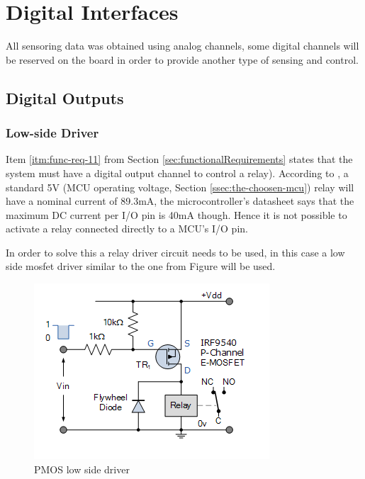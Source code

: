 \section{Digital Interfaces}\label{sec:digital-interfaces}

	All sensoring data was obtained using analog channels, some digital channels will be reserved on the board in order to provide another type of sensing and control.

	\subsection{Digital Outputs}\label{ssec:digital-outputs}

		\subsubsection{Low-side Driver}\label{sssec:digital-outputs-low-side-driver}

			Item \ref{itm:func-req-11} from Section \ref{sec:functionalRequirements} states that the system must have a digital output channel to control a relay). According to \cite{songle-relay-datasheet}, a standard 5V (MCU operating voltage, Section \ref{ssec:the-choosen-mcu}) relay will have a nominal current of 89.3mA, the microcontroller's datasheet \cite{atmega328p-datasheet} says that the maximum DC current per I/O pin is 40mA though. Hence it is not possible to activate a relay connected directly to a MCU's I/O pin.
			\par 
			In order to solve this a relay driver circuit needs to be used, in this case a low side mosfet driver similar to the one from Figure \cite{pmos-low-side-driver} will be used.

			\begin{figure}[htbp]
				\centering
				\includegraphics[scale=1]{figuras/fig-pmos-low-side-driver.png}
				\caption{PMOS low side driver \cite{pmos-low-side-driver}}
				\label{fig:pmos-low-side-driver}
			\end{figure}

